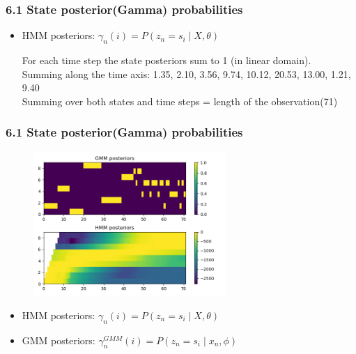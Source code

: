 \documentclass[t]{beamer}
\begin{document}
\begin{frame}
	\frametitle{6.1 State posterior(Gamma) probabilities}
	\begin{itemize}
		\item HMM posteriors: $\gamma_n(i) = P(z_n = s_i \mid X, \theta)$
		
		For each time step the state posteriors sum to 1 (in linear domain).\\

		Summing along the time axis: 1.35, 2.10, 3.56, 9.74, 10.12, 20.53, 13.00, 1.21, 9.40\\
		
		Summing over both states and time steps = length of the observation(71)

	\end{itemize}

\end{frame}
	
\begin{frame}
\frametitle{6.1 State posterior(Gamma) probabilities}
	\begin{figure}
		\centering
		\includegraphics[width=0.65\textwidth]{figures/61.png}
	\end{figure}
	\begin{itemize}
		\item HMM posteriors: $\gamma_n(i) = P(z_n = s_i \mid X, \theta)$
		\item GMM posteriors: $\gamma_n^{GMM}(i) = P(z_n = s_i \mid x_n, \phi)$
	\end{itemize}


\end{frame}
\end{document}
